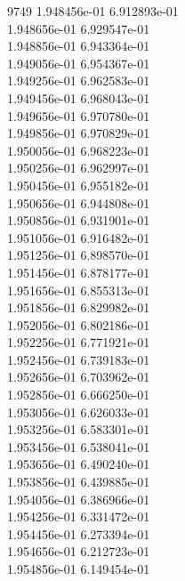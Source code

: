 9749	1.948456e-01	6.912893e-01	\\ 	1.948656e-01	6.929547e-01	\\ 	1.948856e-01	6.943364e-01	\\ 	1.949056e-01	6.954367e-01	\\ 	1.949256e-01	6.962583e-01	\\ 	1.949456e-01	6.968043e-01	\\ 	1.949656e-01	6.970780e-01	\\ 	1.949856e-01	6.970829e-01	\\ 	1.950056e-01	6.968223e-01	\\ 	1.950256e-01	6.962997e-01	\\ 	1.950456e-01	6.955182e-01	\\ 	1.950656e-01	6.944808e-01	\\ 	1.950856e-01	6.931901e-01	\\ 	1.951056e-01	6.916482e-01	\\ 	1.951256e-01	6.898570e-01	\\ 	1.951456e-01	6.878177e-01	\\ 	1.951656e-01	6.855313e-01	\\ 	1.951856e-01	6.829982e-01	\\ 	1.952056e-01	6.802186e-01	\\ 	1.952256e-01	6.771921e-01	\\ 	1.952456e-01	6.739183e-01	\\ 	1.952656e-01	6.703962e-01	\\ 	1.952856e-01	6.666250e-01	\\ 	1.953056e-01	6.626033e-01	\\ 	1.953256e-01	6.583301e-01	\\ 	1.953456e-01	6.538041e-01	\\ 	1.953656e-01	6.490240e-01	\\ 	1.953856e-01	6.439885e-01	\\ 	1.954056e-01	6.386966e-01	\\ 	1.954256e-01	6.331472e-01	\\ 	1.954456e-01	6.273394e-01	\\ 	1.954656e-01	6.212723e-01	\\ 	1.954856e-01	6.149454e-01	\\ \hline
